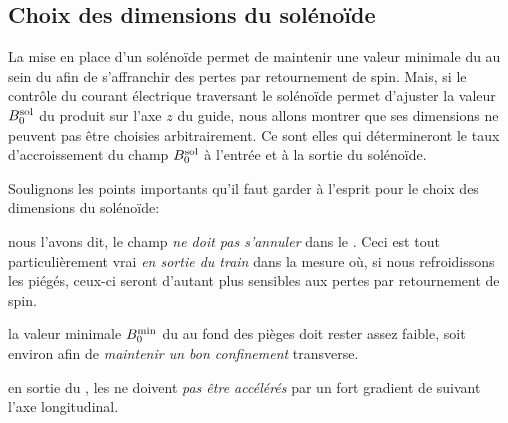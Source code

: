 \subsection{Choix des dimensions du solénoïde}\label{sec:ChoixDimensionSpire}
La mise en place d'un solénoïde permet de maintenir une valeur minimale du \chm au sein du \tp afin de s'affranchir des pertes par retournement de spin. Mais, si le contrôle du courant électrique traversant le solénoïde permet d'ajuster la valeur ${B_{0}^{\rm sol}}$ du \chm produit sur l'axe $z$ du guide, nous allons montrer que ses dimensions ne peuvent pas être choisies arbitrairement. Ce sont elles qui détermineront le taux d'accroissement du champ ${B_{0}^{\rm sol}}$ à l'entrée et à la sortie du solénoïde.



\noindent Soulignons les points importants qu'il faut garder à l'esprit pour le choix des dimensions du solénoïde:
\begin{itemizel}
	\item nous l'avons dit, le champ \emph{ne doit pas s'annuler} dans le \tpm. Ceci est tout particulièrement vrai \emph{en sortie du train} dans la mesure où, si nous refroidissons les \pats piégés, ceux-ci seront d'autant plus sensibles aux pertes par retournement de spin.
	\item la valeur minimale ${B_{0}^{\rm min}}$ du \chm au fond des pièges doit rester assez faible, soit environ  afin de \emph{maintenir un bon confinement} transverse. 
	\item en sortie du \tp, les \pats ne doivent \emph{pas être accélérés} par un fort gradient de \chm suivant l'axe longitudinal.
\end{itemizel}

\casse

